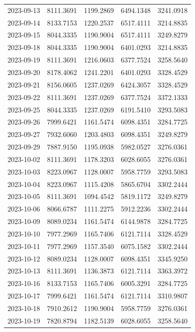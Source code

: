 \begin{footnotesize}
\begin{longtable}{lllll}
2023-09-13 & 8111.3691 & 1199.2869 & 6494.1348 & 3241.0918 \\
2023-09-14 & 8133.7153 & 1220.2537 & 6517.4111 & 3214.8835 \\
2023-09-15 & 8044.3335 & 1190.9004 & 6517.4111 & 3249.8279 \\
2023-09-18 & 8044.3335 & 1190.9004 & 6401.0293 & 3214.8835 \\
2023-09-19 & 8111.3691 & 1216.0603 & 6377.7524 & 3258.5640 \\
2023-09-20 & 8178.4062 & 1241.2201 & 6401.0293 & 3328.4529 \\
2023-09-21 & 8156.0605 & 1237.0269 & 6424.3057 & 3328.4529 \\
2023-09-22 & 8111.3691 & 1237.0269 & 6377.7524 & 3372.1333 \\
2023-09-25 & 8044.3335 & 1237.0269 & 6191.5410 & 3293.5083 \\
2023-09-26 & 7999.6421 & 1161.5474 & 6098.4351 & 3284.7725 \\
2023-09-27 & 7932.6060 & 1203.4803 & 6098.4351 & 3249.8279 \\
2023-09-29 & 7887.9150 & 1195.0938 & 5982.0527 & 3276.0361 \\
2023-10-02 & 8111.3691 & 1178.3203 & 6028.6055 & 3276.0361 \\
2023-10-03 & 8223.0967 & 1128.0007 & 5958.7759 & 3293.5083 \\
2023-10-04 & 8223.0967 & 1115.4208 & 5865.6704 & 3302.2444 \\
2023-10-05 & 8111.3691 & 1094.4542 & 5819.1172 & 3249.8279 \\
2023-10-06 & 8066.6787 & 1111.2275 & 5912.2236 & 3302.2444 \\
2023-10-09 & 8089.0234 & 1161.5474 & 6144.9878 & 3284.7725 \\
2023-10-10 & 7977.2969 & 1165.7406 & 6121.7114 & 3328.4529 \\
2023-10-11 & 7977.2969 & 1157.3540 & 6075.1582 & 3302.2444 \\
2023-10-12 & 8089.0234 & 1128.0007 & 6098.4351 & 3345.9250 \\
2023-10-13 & 8111.3691 & 1136.3873 & 6121.7114 & 3363.3972 \\
2023-10-16 & 8133.7153 & 1165.7406 & 6005.3291 & 3284.7725 \\
2023-10-17 & 7999.6421 & 1161.5474 & 6121.7114 & 3310.9807 \\
2023-10-18 & 7910.2612 & 1190.9004 & 5958.7759 & 3276.0361 \\
2023-10-19 & 7820.8794 & 1182.5139 & 6028.6055 & 3258.5640 \\

\end{longtable}
\end{footnotesize}

